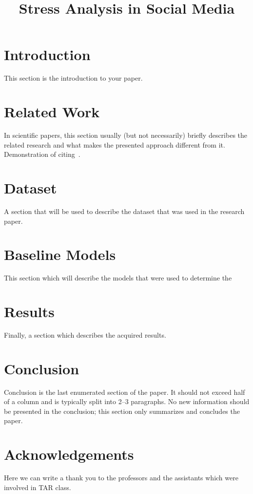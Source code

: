 \documentclass[10pt, a4paper]{article}
\title{Stress Analysis in Social Media}
\begin{document}
\maketitleabstract

\section{Introduction}

This section is the introduction to your paper.

\section{Related Work}

In scientific papers, this section usually (but not necessarily) briefly describes the related research and what makes the presented approach different from it.
Demonstration of citing~\citep{maguire-76}.

\section{Dataset}

A section that will be used to describe the dataset that was used in the research paper.

\section{Baseline Models}

This section which will describe the models that were used to determine the

\section{Results}

Finally, a section which describes the acquired results.

\section{Conclusion}

Conclusion is the last enumerated section of the paper.
It should not exceed half of a column and is typically split into 2--3 paragraphs.
No new information should be presented in the conclusion; this section only summarizes and concludes the paper.

\section*{Acknowledgements}

Here we can write a thank you to the professors and the assistants which were involved in TAR class.


 
\end{document}
